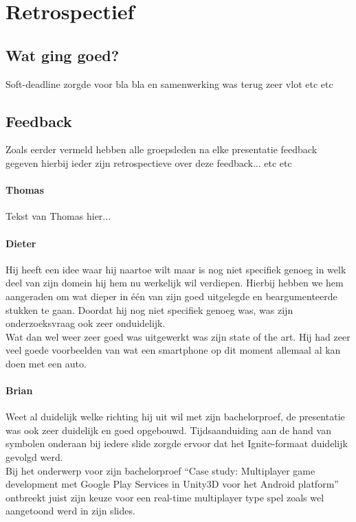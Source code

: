 \documentclass[fleqn,10pt]{voorstel}
\begin{document}
\section{Retrospectief}
\subsection{Wat ging goed?}
Soft-deadline zorgde voor bla bla en samenwerking was terug zeer vlot etc etc

\subsection{Feedback}
Zoals eerder vermeld hebben alle groepsleden na elke presentatie feedback gegeven hierbij ieder zijn retrospectieve over deze feedback... etc etc

\paragraph{Thomas}
Tekst van Thomas hier...

\paragraph{Dieter}
Hij heeft een idee waar hij naartoe wilt maar is nog niet specifiek genoeg in welk deel van zijn domein hij hem nu werkelijk wil verdiepen. Hierbij hebben we hem aangeraden om wat dieper in één van zijn goed uitgelegde en beargumenteerde stukken te gaan. Doordat hij nog niet specifiek genoeg was, was zijn onderzoeksvraag ook zeer onduidelijk.\\
Wat dan wel weer zeer goed was uitgewerkt was zijn state of the art. Hij had zeer veel goede voorbeelden van wat een smartphone op dit moment allemaal al kan doen met een auto.

\paragraph{Brian}
Weet al duidelijk welke richting hij uit wil met zijn bachelorproef, de presentatie was ook zeer duidelijk en goed opgebouwd. Tijdsaanduiding aan de hand van symbolen onderaan bij iedere slide zorgde ervoor dat het Ignite-formaat duidelijk gevolgd werd.\\
Bij het onderwerp voor zijn bachelorproef “Case study: Multiplayer game development met Google Play Services in Unity3D voor het Android platform” ontbreekt juist zijn keuze voor een real-time multiplayer type spel zoals wel aangetoond werd in zijn slides.
\end{document}
